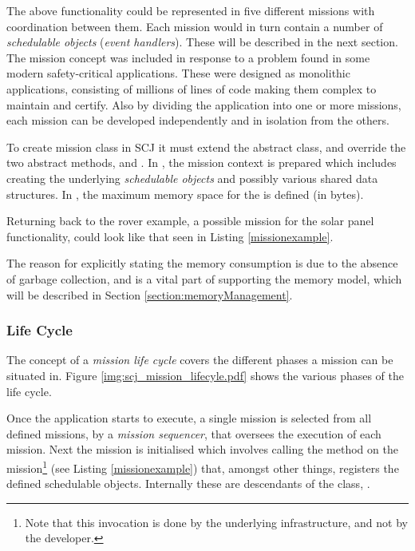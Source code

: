 The above functionality could be represented in five different missions with coordination between them. Each mission would in turn contain a number of \textit{schedulable objects} (\textit{event handlers}). These will be described in the next section. The mission concept was included in response to a problem found in some modern safety-critical applications. These were designed as monolithic applications, consisting of millions of lines of code making them complex to maintain and certify. Also by dividing the application into one or more missions, each mission can be developed independently and in isolation from the others.  

To create mission class in SCJ it must extend the abstract  class, and override the two abstract methods,  and . In , the mission context is prepared which includes creating the underlying \textit{schedulable objects} and possibly various shared data structures. In , the maximum memory space for the  is defined (in bytes).

Returning back to the rover example, a possible mission for the solar panel functionality, could look like that seen in Listing \ref{missionexample}.



The reason for explicitly stating the memory consumption is due to the absence of garbage collection, and is a vital part of supporting the memory model, which will be described in Section \ref{section:memoryManagement}.

\subsubsection{Life Cycle}
\label{subsec:lifecycle}
The concept of a \textit{mission life cycle} covers the different phases a mission can be situated in. Figure \ref{img:scj_mission_lifecyle.pdf} shows the various phases of the life cycle.


Once the application starts to execute, a single mission is selected from all defined missions, by a \textit{mission sequencer}, that oversees the execution of each mission. Next the mission is initialised which involves calling the  method on the mission\footnote{Note that this invocation is done by the underlying infrastructure, and not by the developer.} (see Listing \ref{missionexample}) that, amongst other things, registers the defined schedulable objects. Internally these are descendants of the class, . 

